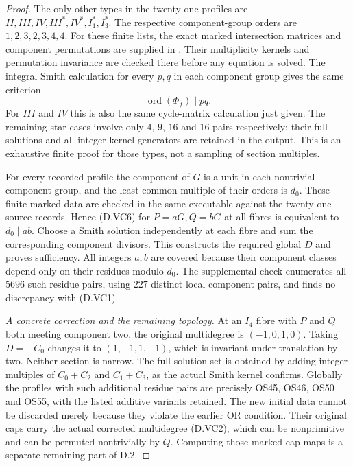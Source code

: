 \begin{proof}
The only other types in the twenty-one profiles are
$II,III,IV,III^*,IV^*,I_1^*,I_3^*$.
The respective component-group orders are $1,2,3,2,3,4,4$.
For these finite lists, the exact marked intersection
matrices and component permutations are supplied in
.
Their multiplicity kernels and permutation invariance are
checked there before any equation is solved. The integral
Smith calculation for every $p,q$ in each component group
gives the same criterion
\[
              \operatorname{ord}(\Phi_f)\mid pq.           \tag{D.VC6}
\]
For $III$ and $IV$ this is also the same cycle-matrix
calculation just given. The remaining star cases involve
only $4$, $9$, $16$ and $16$ pairs respectively; their
full solutions and all integer kernel generators are
retained in the output. This is an exhaustive finite
proof for those types, not a sampling of section multiples.

For every recorded profile the component of $G$ is a unit
in each nontrivial component group, and the least common
multiple of their orders is $d_0$. These finite marked
data are checked in the same executable against the
twenty-one source records. Hence (D.VC6) for $P=aG,Q=bG$
at all fibres is equivalent to $d_0\mid ab$.
Choose a Smith solution independently at each fibre and
sum the corresponding component divisors. This constructs
the required global $D$ and proves sufficiency.
All integers $a,b$ are covered because their component
classes depend only on their residues modulo $d_0$.
The supplemental check enumerates all $5696$ such residue
pairs, using $227$ distinct local component pairs, and
finds no discrepancy with (D.VC1).

\emph{A concrete correction and the remaining topology.}
At an $I_4$ fibre with $P$ and $Q$ both meeting component
two, the original multidegree is $(-1,0,1,0)$.
Taking $D=-C_0$ changes it to $(1,-1,1,-1)$, which is
invariant under translation by two. Neither section is
narrow. The full solution set is obtained by adding
integer multiples of $C_0+C_2$ and $C_1+C_3$, as the
actual Smith kernel confirms.
Globally the profiles with such additional residue pairs
are precisely OS45, OS46, OS50 and OS55, with the listed
additive variants retained. The new initial data cannot
be discarded merely because they violate the earlier OR
condition. Their original caps carry the actual corrected
multidegree (D.VC2), which can be nonprimitive and can
be permuted nontrivially by $Q$. Computing those marked
cap maps is a separate remaining part of D.2.



\end{proof}

